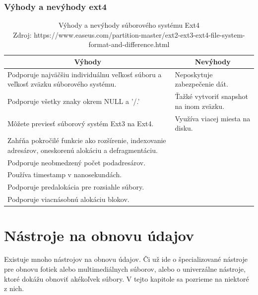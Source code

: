 \documentclass[12pt,oneside,slovak,a4paper]{article}
\begin{document}
\subsubsection{Výhody a nevýhody ext4}


\begin{table}[H]
\begin{tabularx}{\textwidth}{|X|X|}
\hline
\multicolumn{1}{|c|}{\textbf{Výhody}} & \multicolumn{1}{c|}{\textbf{Nevýhody}} \\ \hline
Podporuje najväčšiu individuálnu veľkosť súboru a veľkosť zväzku súborového systému. & Neposkytuje zabezpečenie dát. \\ \hline
Podporuje všetky znaky okrem NULL a '/.' & Ťažké vytvoriť snapshot na inom zväzku. \\ \hline
Môžete previesť súborový systém Ext3 na Ext4. & Využíva viacej miesta na disku. \\ \hline
Zahŕňa pokročilé funkcie ako rozšírenie, indexovanie adresárov, oneskorenú alokáciu a defragmentáciu. &  \\ \hline
Podporuje neobmedzený počet podadresárov. &  \\ \hline
Používa timestamp v nanosekundách. &  \\ \hline
Podporuje predalokácia pre rozsiahle súbory. &  \\ \hline
Podporuje viacnásobnú alokáciu blokov. &  \\ \hline
\end{tabularx}
\centering
\captionsetup{justification=centering,margin=2cm}
\caption{Výhody a nevýhody súborového systému Ext4 \\ Zdroj: https://www.easeus.com/partition-master/ext2-ext3-ext4-file-system-format-and-difference.html}
\end{table}


\section{Nástroje na obnovu údajov}
Existuje mnoho nástrojov na obnovu údajov. Či už ide o špecializované nástroje pre obnovu fotiek alebo multimediálnych súborov, alebo o univerzálne nástroje, ktoré dokážu obnoviť akékoľvek súbory. V tejto kapitole sa pozrieme na niektoré z nich.
\end{document}

